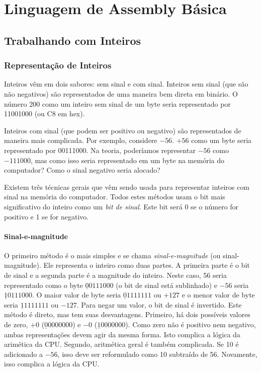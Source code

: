 
\chapter{Linguagem de Assembly Básica}

\section{Trabalhando com Inteiros }

\subsection{Representação de Inteiros }

Inteiros vêm em dois sabores: sem sinal e com sinal. Inteiros sem sinal (que 
são não negativos) são representados de uma maneira bem direta em binário.
O número 200 como um inteiro sem sinal de um byte seria representado por
11001000 (ou C8 em hex).

Inteiros com sinal (que podem ser positivo ou negativo) são representados de maneira
mais complicada. Por exemplo, considere $-56$. $+56$ como um byte seria
representado por 00111000. Na teoria, poderíamos representar $-56$ como $-111000$,
mas como isso seria representado em um byte na memória do computador?
Como o sinal negativo seria alocado?

Existem três técnicas gerais que vêm sendo usada para representar
inteiros com sinal na memória do computador. Todos estes métodos usam o bit
mais significativo do inteiro como um \emph{bit
de sinal}.  Este bit será 0 se o número for positivo
e 1 se for negativo.

\subsubsection{Sinal-e-magnitude }

O primeiro método é o mais simples e se chama \emph{sinal-e-magnitude} (ou sinal-magnitude). Ele 
representa o inteiro como duas partes. A primeira parte é o bit de sinal e 
a segunda parte é a magnitude do inteiro. Neste caso, 56 seria representado como
o byte $\underline{0}0111000$ (o bit de sinal está sublinhado) e $-56$
seria $\underline{1}0111000$. O maior valor de byte seria
$\underline{0}1111111$ ou $+127$ e o menor valor de byte seria 
$\underline{1}1111111$ ou $-127$. Para negar um valor, o bit de sinal é invertido.
Este método é direto, mas tem suas desvantagens. Primeiro,
há dois possíveis valores de zero, $+0$ ($\underline{0}0000000$) e
$-0$ ($\underline{1}0000000$). Como zero não é positivo nem negativo,
ambas representações devem agir da mesma forma. Isto complica a lógica 
da arimética da CPU. Segundo, aritmética geral é também complicada.
Se 10 é adicionado a $-56$, isso deve ser reformulado como 10 subtraído de 56. Novamente,
isso complica a lógica da CPU.

